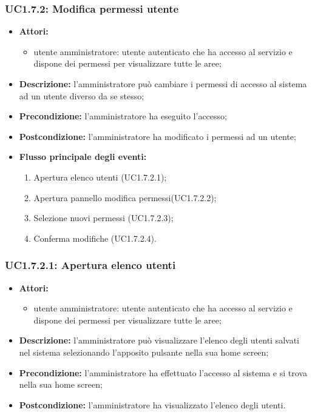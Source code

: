 \subsubsection{UC1.7.2: Modifica permessi utente}

\begin{itemize}
	\item \textbf{Attori:}
	\begin{itemize}
		\item utente amministratore: utente autenticato che ha accesso al servizio e dispone dei permessi per visualizzare tutte le aree;
	\end{itemize}
	\item \textbf{Descrizione:} l'amministratore può cambiare i permessi di accesso al sistema ad un utente diverso da se stesso;
	\item \textbf{Precondizione:} l'amministratore ha eseguito l'accesso;
	\item \textbf{Postcondizione:} l'amministratore ha modificato i permessi ad un utente;
	\item \textbf{Flusso principale degli eventi:}
	\begin{enumerate}
		\item Apertura elenco utenti (UC1.7.2.1);
		\item Apertura pannello modifica permessi(UC1.7.2.2);
		\item Selezione nuovi permessi (UC1.7.2.3);
		\item Conferma modifiche (UC1.7.2.4).
	\end{enumerate}
\end{itemize}

\subsubsection{UC1.7.2.1: Apertura elenco utenti}

\begin{itemize}
	\item \textbf{Attori:}
	\begin{itemize}
		\item utente amministratore: utente autenticato che ha accesso al servizio e dispone dei permessi per visualizzare tutte le aree;
	\end{itemize}
	\item \textbf{Descrizione:} l'amministratore può visualizzare l'elenco degli utenti salvati nel sistema selezionando l'apposito pulsante nella sua home screen;
	\item \textbf{Precondizione:} l'amministratore ha effettuato l'accesso al sistema e si trova nella sua home screen;
	\item \textbf{Postcondizione:} l'amministratore ha visualizzato l'elenco degli utenti.
\end{itemize}

